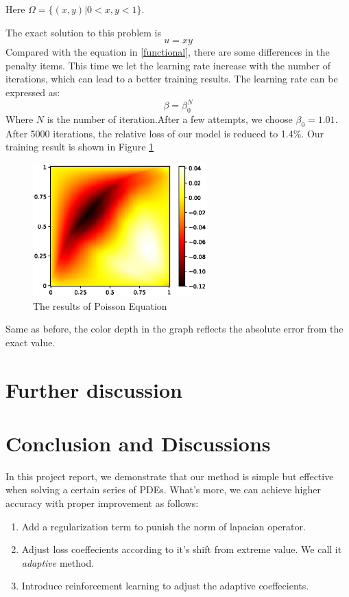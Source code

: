\documentclass{article}
\begin{document}
Here $\Omega =\{(x,y)| 0<x,y<1\}$.
\par The exact solution to this problem is 
\begin{equation}
u=xy
\end{equation}
Compared with the equation in \ref{functional}, there are some differences in the penalty items. This time we let the learning rate increase with the number of iterations, which can lead to a better training results. The learning rate can be expressed as:
\begin{equation}
\beta=\beta_{0}^N
\end{equation}
Where $N$ is the number of iteration.After a few attempts, we choose $\beta_0=1.01$. After 5000 iterations, the relative loss of our model is reduced to 1.4\%. Our training result is shown in Figure \ref{3.2a}
\begin{figure}[ht]
 	 \centering
 	 \includegraphics[width=0.6\textwidth]{./images/loss_yubing.eps} 
	 \caption {The results of Poisson Equation}
	 \label{3.2a}
\end{figure}

Same as before, the color depth in the graph reflects the absolute error from the exact value.


\section{Further discussion}

\section{Conclusion and Discussions}

In this project report, we demonstrate that our method is simple but effective when solving a certain series of PDEs. What's more, we can achieve higher accuracy with proper improvement as follows:

\begin{enumerate}
\item
Add a regularization term to punish the norm of lapacian operator. 
\item
Adjust loss coeffecients according to it's shift from  extreme value. We call it \emph{adaptive} method.
\item
Introduce reinforcement learning to adjust the adaptive coeffecients.
\end{enumerate}
\end{document}
